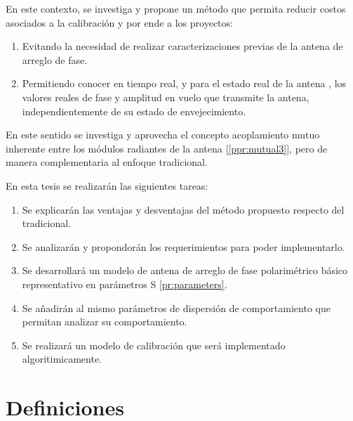 En este contexto, se investiga y propone un método que permita reducir costos 
asociados a la calibración y por ende a los proyectos:

\begin{enumerate}
    \item Evitando la necesidad de realizar caracterizaciones previas de la 
antena de arreglo de fase.
    \item Permitiendo conocer en tiempo real, y para el estado real de la antena
, los valores reales de fase y amplitud en vuelo que transmite la antena, 
independientemente de su estado de envejecimiento.
\end{enumerate}

En este sentido se investiga y aprovecha el concepto acoplamiento mutuo 
inherente entre los módulos radiantes de la antena [\ref{ppr:mutual3}], pero de
manera complementaria al enfoque tradicional. 

En esta tesis se realizarán las siguientes tareas:

\begin{enumerate}
    \item Se explicarán las ventajas y desventajas del método propuesto respecto
del tradicional.
    \item Se analizarán y propondorán los requerimientos para poder 
implementarlo.
    \item Se desarrollará un modelo de antena de arreglo de fase polarimétrico 
básico representativo en parámetros S \ref{pr:parameters}.
    \item Se añadirán al mismo parámetros de dispersión de comportamiento que 
permitan analizar su comportamiento.
    \item Se realizará un modelo de calibración que será implementado 
algoritimicamente.
\end{enumerate}


\section{Definiciones}

